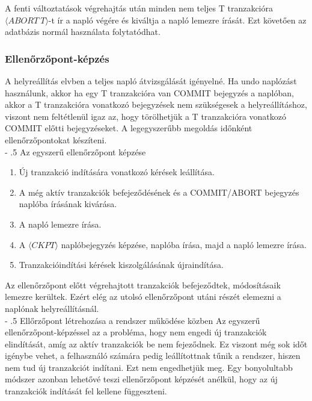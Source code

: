 \documentclass[margin=0px]{article}
\makeatletter
\renewcommand\paragraph{%
	\@startsection{paragraph}{4}{0mm}%
	{-\baselineskip}%
	{.5\baselineskip}%
	{\normalfont\normalsize\bfseries}}
\makeatother
\begin{document}
A fenti változtatások végrehajtás után minden nem teljes T tranzakcióra $\langle ABORT \ T \rangle$-t ír a napló végére és
kiváltja a napló lemezre írását. Ezt követően az adatbázis normál használata folytatódhat.

\subsubsection{Ellenőrzőpont-képzés}

A helyreállítás elvben a teljes napló átvizsgálását igényelné. Ha undo naplózást használunk, akkor ha egy T tranzakcióra
van COMMIT bejegyzés a naplóban, akkor a T tranzakcióra vonatkozó bejegyzések nem szükségesek a helyreállításhoz, viszont
nem feltétlenül igaz az, hogy törölhetjük a T tranzakcióra vonatkozó COMMIT előtti bejegyzéseket. A legegyszerűbb megoldás
időnként ellenőrzőpontokat készíteni.\\

\paragraph{Az egyszerű ellenőrzőpont képzése}
\begin{enumerate}
    \item	Új tranzakció indítására vonatkozó kérések leállítása.
    \item	A még aktív tranzakciók befejeződésének és a COMMIT/ABORT bejegyzés naplóba írásának kivárása.
    \item	A napló lemezre írása.
    \item	A $\langle CKPT \rangle$ naplóbejegyzés képzése, naplóba írása, majd a napló lemezre írása.
    \item	Tranzakcióindítási kérések kiszolgálásának újraindítása.
\end{enumerate}

Az ellenőrzőpont előtt végrehajtott tranzakciók befejeződtek, módosításaik lemezre kerültek. Ezért elég az utolsó ellenőrzőpont utáni
részét elemezni a naplónak helyreállításnál.\\

\paragraph{Ellőrzőpont létrehozása a rendszer működése közben}
Az egyszerű ellenőrzőpont-képzéssel az a probléma, hogy nem engedi új tranzakciók elindítását, amíg az aktív tranzakciók be nem
fejeződnek. Ez viszont még sok időt igénybe vehet, a felhasználó számára pedig leállítottnak tűnik a rendszer, hiszen nem
tud új tranzakciót indítani. Ezt nem engedhetjük meg. Egy bonyolultabb módszer azonban lehetővé teszi ellenőrzőpont képzését
anélkül, hogy az új tranzakciók indítását fel kellene függeszteni.\\
\end{document}
